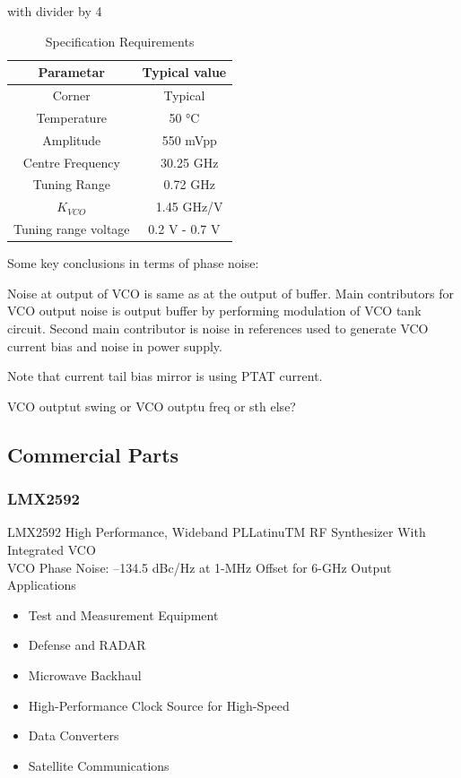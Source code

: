 \documentclass{article}
\begin{document}
with divider by 4

\begin{table}[ht]
	\centering
	\begin{tabular}{|c|c|}
		\hline
		Parametar & Typical value \\
		\hline
		Corner & Typical \\
		\hline
		Temperature & 50 °C \\
		\hline
		Amplitude & ~ 550 mVpp \\
		\hline
		Centre Frequency & ~ 30.25 GHz \\
		\hline
		Tuning Range & ~ 0.72 GHz \\
		\hline
		$K_{VCO}$ & ~ 1.45 GHz/V \\
		\hline
		Tuning range voltage & 0.2 V - 0.7 V \\
		\hline
	\end{tabular}
	\label{30GHz-VCO-design}
	\caption{Specification Requirements} 
\end{table}

Some key conclusions in terms of phase noise:

Noise at output of VCO is same as at the output of buffer. Main contributors for VCO output noise is output buffer by performing modulation of VCO tank circuit. Second main contributor is noise in references used to generate VCO current bias and noise in power supply.

Note that current tail bias mirror is using PTAT current.

\begin{question}
	VCO outptut swing or VCO outptu freq or sth else?
\end{question}

\subsection{Commercial Parts}

\subsubsection*{LMX2592}
LMX2592 High Performance, Wideband PLLatinuTM RF Synthesizer With Integrated VCO
\\
VCO Phase Noise: –134.5 dBc/Hz at 1-MHz
Offset for 6-GHz Output
\\
Applications
\begin{itemize}
	\item Test and Measurement Equipment
	\item Defense and RADAR
	\item Microwave Backhaul
	\item High-Performance Clock Source for High-Speed
	\item Data Converters
	\item Satellite Communications
\end{itemize}
\end{document}
